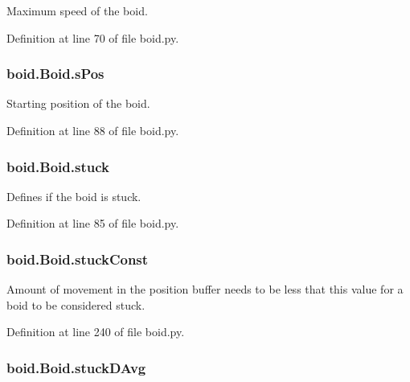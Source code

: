 Maximum speed of the boid. 



Definition at line 70 of file boid.\-py.

\hypertarget{classboid_1_1Boid_a92bf79dcfff9e21d33611cfc89f8823c}{
\subsubsection[{s\-Pos}]{\setlength{\rightskip}{0pt plus 5cm}boid.\-Boid.\-s\-Pos}}\label{classboid_1_1Boid_a92bf79dcfff9e21d33611cfc89f8823c}


Starting position of the boid. 



Definition at line 88 of file boid.\-py.

\hypertarget{classboid_1_1Boid_a099882fd7d72bfd06c15ec20b0425905}{
\subsubsection[{stuck}]{\setlength{\rightskip}{0pt plus 5cm}boid.\-Boid.\-stuck}}\label{classboid_1_1Boid_a099882fd7d72bfd06c15ec20b0425905}


Defines if the boid is stuck. 



Definition at line 85 of file boid.\-py.

\hypertarget{classboid_1_1Boid_abbcf546137204a45278b6caa95c4378b}{
\subsubsection[{stuck\-Const}]{\setlength{\rightskip}{0pt plus 5cm}boid.\-Boid.\-stuck\-Const}}\label{classboid_1_1Boid_abbcf546137204a45278b6caa95c4378b}


Amount of movement in the position buffer needs to be less that this value for a boid to be considered stuck. 



Definition at line 240 of file boid.\-py.

\hypertarget{classboid_1_1Boid_a663164af1a20323f49e002d7576914f7}{
\subsubsection[{stuck\-D\-Avg}]{\setlength{\rightskip}{0pt plus 5cm}boid.\-Boid.\-stuck\-D\-Avg}}\label{classboid_1_1Boid_a663164af1a20323f49e002d7576914f7}


